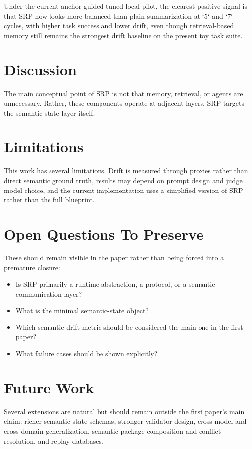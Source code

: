 \documentclass[11pt]{article}
\begin{document}
Under the current anchor-guided tuned local pilot, the clearest positive signal is that SRP now looks more balanced than plain summarization at `5` and `7` cycles, with higher task success and lower drift, even though retrieval-based memory still remains the strongest drift baseline on the present toy task suite.

\section{Discussion}
The main conceptual point of SRP is not that memory, retrieval, or agents are unnecessary. Rather, these components operate at adjacent layers. SRP targets the semantic-state layer itself.

\section{Limitations}
This work has several limitations. Drift is measured through proxies rather than direct semantic ground truth, results may depend on prompt design and judge model choice, and the current implementation uses a simplified version of SRP rather than the full blueprint.

\section{Open Questions To Preserve}
These should remain visible in the paper rather than being forced into a premature closure:

\begin{itemize}[leftmargin=*]
  \item Is SRP primarily a runtime abstraction, a protocol, or a semantic communication layer?
  \item What is the minimal semantic-state object?
  \item Which semantic drift metric should be considered the main one in the first paper?
  \item What failure cases should be shown explicitly?
\end{itemize}

\section{Future Work}
Several extensions are natural but should remain outside the first paper's main claim: richer semantic state schemas, stronger validator design, cross-model and cross-domain generalization, semantic package composition and conflict resolution, and replay databases.
\end{document}
